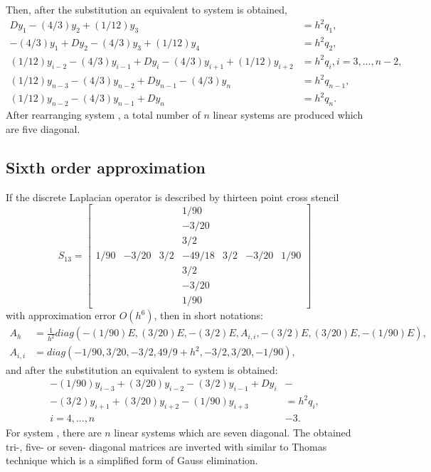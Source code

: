 \documentclass[11pt,a4paper,twoside]{article}
\begin{document}
Then, after the substitution  an equivalent to  system is obtained,
\begin{align}
Dy_1 - (4/3)y_2 + (1/12)y_3 &= h^2 q_1,\nonumber \\
-(4/3)y_1 + Dy_2 - (4/3)y_3 + (1/12)y_4  &= h^2 q_2,\nonumber \\
 (1/12)y_{i-2} - (4/3)y_{i-1} + D y_i - (4/3)y_{i+1} + (1/12)y_{i+2} &= h^2 q_i, i = 3,...,n-2,\nonumber \\
 (1/12)y_{n-3} - (4/3)y_{n-2} + Dy_{n-1} - (4/3)y_n &= h^2 q_{n-1}, \nonumber \\
 (1/12)y_{n-2} - (4/3)y_{n-1} + Dy_n &= h^2 q_n.\label{SubSys5}
\end{align}
After rearranging system , a total number of $n$ linear systems are produced which are five diagonal.

\subsection{Sixth order approximation}

If the discrete Laplacian operator is described by thirteen point cross stencil
\[
S_{13} = 
\begin{bmatrix}
          &       &       &   1/90  & & &  \\
          &       &       &  -3/20  & & &  \\
          &       &       &   3/2     & &   & \\
1/90 & -3/20 &  3/2 & -49/18 & 3/2 & -3/20 & 1/90 \\
          &       &       &   3/2     & &   & \\
          &       &       &  -3/20  & & &  \\
          &       &       &   1/90  & & &
\end{bmatrix}
\]
with approximation error $O(h^6)$, then in short notations:
 \begin{align*} 
A_h &= \frac{1}{h^2}diag( -(1/90)E, (3/20)E, -(3/2)E, A_{i,i}, -(3/2)E, (3/20)E, -(1/90)E), \\
A_{i,i} & = diag(-1/90, 3/20, -3/2, 49/9 + h^2, -3/2, 3/20, -1/90),
\end{align*}
and after the substitution  an equivalent to  system is obtained:
\begin{align}
-(1/90)y_{i-3} + (3/20)y_{i-2} - (3/2)y_{i-1} + D y_i  &-\nonumber \\
  - (3/2)y_{i+1} + (3/20)y_{i+2} -  (1/90)y_{i+3} &= h^2 q_i,\nonumber \\
 i = 4,...,n  &-3. \label{SubSys7}
\end{align}
For system , there are $n$ linear systems which are seven diagonal. The obtained tri-, five- or seven- diagonal matrices are inverted with similar to Thomas technique which is a simplified form of Gauss elimination.
\end{document}
